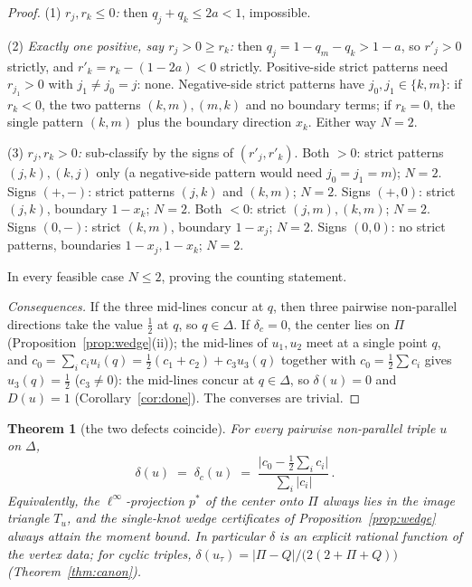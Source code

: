 \documentclass[11pt,reqno]{amsart}
\theoremstyle{plain}
\newtheorem{theorem}{Theorem}[section]
\theoremstyle{definition}
\theoremstyle{remark}
\begin{document}
\begin{proof}
(1) \emph{$r_j,r_k\le0$:} then $q_j+q_k\le2a<1$, impossible.

(2) \emph{Exactly one positive, say $r_j>0\ge r_k$:} then
$q_j=1-q_m-q_k>1-a$, so $r'_j>0$ strictly, and
$r'_k=r_k-(1-2a)<0$ strictly. Positive-side strict patterns need
$r_{j_1}>0$ with $j_1\ne j_0=j$: none. Negative-side strict patterns have
$j_0,j_1\in\{k,m\}$: if $r_k<0$, the two patterns $(k,m),(m,k)$ and no
boundary terms; if $r_k=0$, the single pattern $(k,m)$ plus the boundary
direction $x_k$. Either way $N=2$.

(3) \emph{$r_j,r_k>0$:} sub-classify by the signs of $(r'_j,r'_k)$. Both
$>0$: strict patterns $(j,k),(k,j)$ only (a negative-side pattern would need
$j_0=j_1=m$); $N=2$. Signs $(+,-)$: strict patterns $(j,k)$ and $(k,m)$;
$N=2$. Signs $(+,0)$: strict $(j,k)$, boundary $1-x_k$; $N=2$. Both $<0$:
strict $(j,m),(k,m)$; $N=2$. Signs $(0,-)$: strict $(k,m)$, boundary
$1-x_j$; $N=2$. Signs $(0,0)$: no strict patterns, boundaries
$1-x_j,1-x_k$; $N=2$.

In every feasible case $N\le2$, proving the counting statement.

\emph{Consequences.} If the three mid-lines concur at $q$, then three
pairwise non-parallel directions take the value $\tfrac12$ at $q$, so
$q\in\Delta$. If $\delta_c=0$, the center lies on $\Pi$
(Proposition~\ref{prop:wedge}(ii)); the mid-lines of $u_1,u_2$ meet at a
single point $q$, and $c_0=\sum_ic_iu_i(q)=\tfrac12(c_1+c_2)+c_3u_3(q)$
together with $c_0=\tfrac12\sum c_i$ gives $u_3(q)=\tfrac12$ ($c_3\ne0$): the
mid-lines concur at $q\in\Delta$, so $\delta(u)=0$ and $D(u)=1$
(Corollary~\ref{cor:done}). The converses are trivial.
\end{proof}

\begin{theorem}[the two defects coincide]\label{thm:deltas}
For every pairwise non-parallel triple $u$ on $\Delta$,
\[
\delta(u)\;=\;\delta_c(u)\;=\;
\frac{\bigl|c_0-\tfrac12\sum_ic_i\bigr|}{\sum_i|c_i|}\,.
\]
Equivalently, the $\ell^\infty$-projection $p^\ast$ of the center onto $\Pi$
always lies in the image triangle $T_u$, and the single-knot wedge
certificates of Proposition~\ref{prop:wedge} always attain the moment bound.
In particular $\delta$ is an explicit rational function of the vertex data;
for cyclic triples, $\delta(u_\tau)=|\Pi-Q|/\bigl(2(2+\Pi+Q)\bigr)$
(Theorem~\ref{thm:canon}).
\end{theorem}
\end{document}
